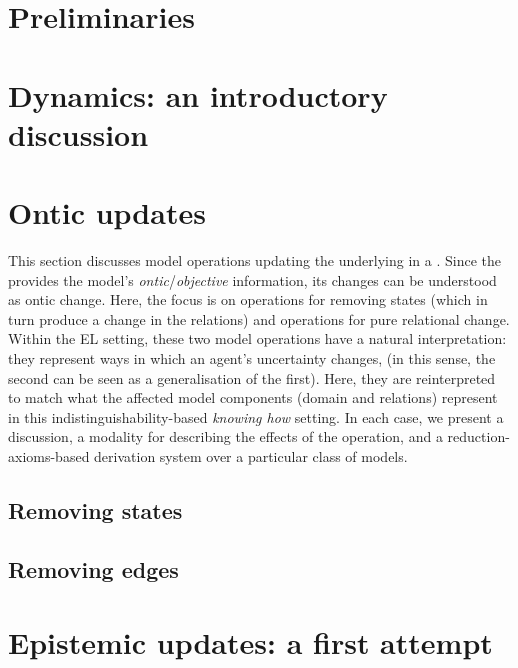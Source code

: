 \documentclass[sn-mathphys-num]{sn-jnl}%
\begin{document}
\section{Preliminaries}
\label{sec:basic}


\section{Dynamics: an introductory discussion}



\section{Ontic updates}
\label{sec:ontic}

This section discusses model operations updating the underlying \lts in a \ults. Since the \lts provides the model's \emph{ontic}/\emph{objective} information, its changes can be understood as ontic change. Here, the focus is on operations for removing states (which in turn produce a change in the relations) and operations for pure relational change. Within the EL setting, these two model operations have a natural interpretation: they represent ways in which an agent's uncertainty changes, (in this sense, the second can be seen as a generalisation of the first). Here, they are reinterpreted to match what the affected model components (domain and relations) represent in this indistinguishability-based \emph{knowing how} setting. In each case, we present a discussion, a modality for describing the effects of the operation, and a reduction-axioms-based derivation system over a particular class of models.

\subsection{Removing states}
\label{sec:pal}


\subsection{Removing edges}
\label{sec:aul}


\section{Epistemic updates: a first attempt}
\label{sec:epistemic-basic} 
\end{document}
